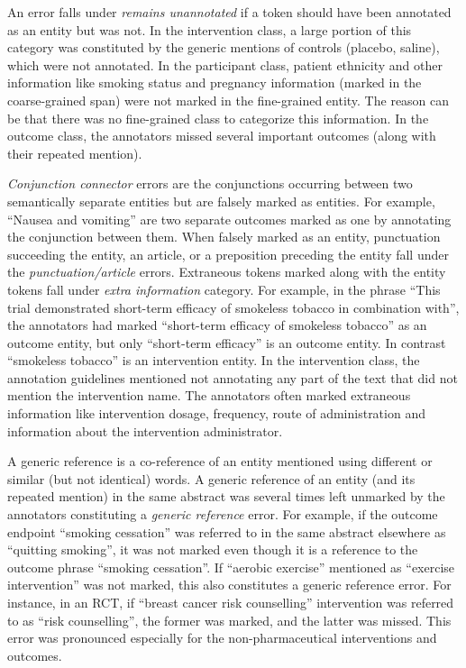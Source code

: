 \documentclass[10.7pt,]{article}
\begin{document}
An error falls under \textit{remains unannotated} if a token should have been annotated as an entity but was not.
In the intervention class, a large portion of this category was constituted by the generic mentions of controls (placebo, saline), which were not annotated.
In the participant class, patient ethnicity and other information like smoking status and pregnancy information (marked in the coarse-grained span) were not marked in the fine-grained entity.
The reason can be that there was no fine-grained class to categorize this information. 
In the outcome class, the annotators missed several important outcomes (along with their repeated mention).

\textit{Conjunction connector} errors are the conjunctions occurring between two semantically separate entities but are falsely marked as entities.
For example, ``Nausea and vomiting'' are two separate outcomes marked as one by annotating the conjunction between them.
When falsely marked as an entity, punctuation succeeding the entity, an article, or a preposition preceding the entity fall under the \textit{punctuation/article} errors.
Extraneous tokens marked along with the entity tokens fall under \textit{extra information} category.
For example, in the phrase ``This trial demonstrated short-term efficacy of smokeless tobacco in combination with'', the annotators had marked ``short-term efficacy of smokeless tobacco'' as an outcome entity, but only ``short-term efficacy'' is an outcome entity.
In contrast ``smokeless tobacco'' is an intervention entity. 
In the intervention class, the annotation guidelines mentioned not annotating any part of the text that did not mention the intervention name.
The annotators often marked extraneous information like intervention dosage, frequency, route of administration and information about the intervention administrator.

A generic reference is a co-reference of an entity mentioned using different or similar (but not identical) words. 
A generic reference of an entity (and its repeated mention) in the same abstract was several times left unmarked by the annotators constituting a \textit{generic reference} error.
For example, if the outcome endpoint ``smoking cessation'' was referred to in the same abstract elsewhere as ``quitting smoking'', it was not marked even though it is a reference to the outcome phrase ``smoking cessation''.
If ``aerobic exercise'' mentioned as ``exercise intervention'' was not marked, this also constitutes a generic reference error.
For instance, in an RCT, if ``breast cancer risk counselling'' intervention was referred to as ``risk counselling'', the former was marked, and the latter was missed.
This error was pronounced especially for the non-pharmaceutical interventions and outcomes.
\end{document}
